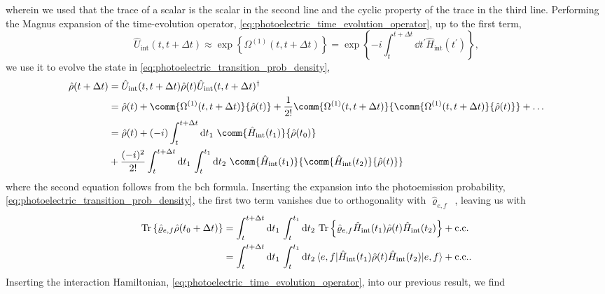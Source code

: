 wherein we used that the trace of a scalar is the scalar in the second line and the cyclic property of the trace in the third line.
Performing the Magnus expansion of the time-evolution operator, \cref{eq:photoelectric_time_evolution_operator}, up to the first term,
\begin{equation}
	\hat{U}_\text{int}(t,t+\Delta t)
	\approx
	\exp\left\{
		\Omega^{(1)}(t,t+\Delta t)
	\right\}
	=
	\exp\left\{
		-i
		\int_t^{t+\Delta t}\dd{t^\prime}
		\hat{H}_\text{int}(t^\prime)
	\right\}
	,
\end{equation}
we use it to evolve the state in \cref{eq:photoelectric_transition_prob_density},
\begin{equation}
	\begin{split}
		\hat\rho(t+\Delta t)
		&=
		\hat{U}_\text{int}(t,t+\Delta t)
		\hat\rho(t)
		\hat{U}_\text{int}(t,t+\Delta t)^\dagger
		\\
		&=
		\hat\rho(t)
		+
		\comm{\Omega^{(1)}(t,t+\Delta t)}{\hat\rho(t)}
		+
		\frac{1}{2!}
		\comm{\Omega^{(1)}(t,t+\Delta t)}{\comm{\Omega^{(1)}(t,t+\Delta t)}{\hat\rho(t)}}
		+
		\dots
		\\
		&=
		\hat\rho(t)
		+
		(-i)
		\int_t^{t+\Delta t}\dd{t_1}
		\comm{\hat{H}_\text{int}(t_1)}{\hat\rho(t_0)}
		\\
		&+
		\frac{(-i)^2}{2!}
		\int_{t}^{t+\Delta t}\dd{t_1}
		\int_{t}^{t_1}\dd{t_2}
		\comm{\hat{H}_\text{int}(t_1)}{\comm{\hat{H}_\text{int}(t_2)}{\hat\rho(t)}}
	\end{split}
\end{equation}
where the second equation follows from the \gls{bch} formula.
Inserting the expansion into the photoemission probability, \cref{eq:photoelectric_transition_prob_density}, the first two term vanishes due to orthogonality with $\hat\varrho_{e,f}$~\cite[p.~686]{Mandel1995}, leaving us with
\begin{equation}
	\begin{split}
		\trace\left\{
			\hat\varrho_{e,f}
			\hat\rho(t_0+\Delta t)
		\right\}
		&=
		\int_t^{t+\Delta t}\dd{t_1}
		\int_t^{t_1}
		\dd{t_2}
		\trace\left\{
			\hat\varrho_{e,f}
			\hat{H}_\text{int}(t_1)
			\hat\rho(t)
			\hat{H}_\text{int}(t_2)
		\right\}
		+
		\text{c.c.}
		\\
		&=
		\int_t^{t+\Delta t}\dd{t_1}
		\int_t^{t_1}
		\dd{t_2}
		\bra{e,f}
			\hat{H}_\text{int}(t_1)
			\hat\rho(t)
			\hat{H}_\text{int}(t_2)
		\ket{e,f}
		+
		\text{c.c.}
		.
	\end{split}
\end{equation}
Inserting the interaction Hamiltonian, \cref{eq:photoelectric_time_evolution_operator}, into our previous result, we find~\cite[p.~693]{Mandel1995}

